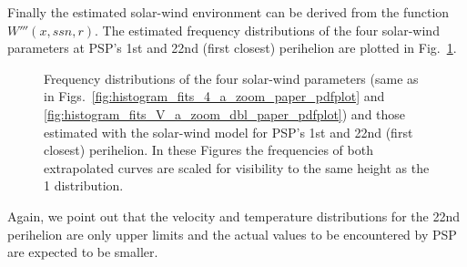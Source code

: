 \documentclass[]{aa}
\begin{document}
        Finally the estimated solar-wind environment can be derived from the function $W'''(x,ssn,r)$. The estimated frequency distributions of the four solar-wind parameters at PSP's 1st and 22nd (first closest) perihelion are plotted in Fig.~\ref{fig:SPP_sw_distributions_b}.
        \begin{figure}
                \caption{Frequency distributions of the four solar-wind parameters (same as in Figs.~\ref{fig:histogram_fits_4_a_zoom_paper_pdfplot} and \ref{fig:histogram_fits_V_a_zoom_dbl_paper_pdfplot}) and those estimated with the solar-wind model for PSP's 1st and 22nd (first closest) perihelion. In these Figures the frequencies of both extrapolated curves are scaled for visibility to the same height as the \SI{1}{\au} distribution.}
                \label{fig:SPP_sw_distributions_b}
        \end{figure}
        Again, we point out that the velocity and temperature distributions for the 22nd perihelion are only upper limits and the actual values to be encountered by PSP are expected to be smaller.
\end{document}
